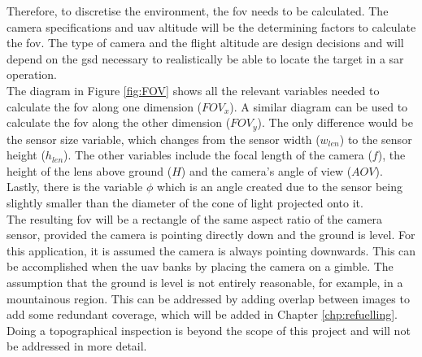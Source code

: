Therefore, to discretise the environment, the \acl{fov} needs to be calculated. The camera specifications and \acs{uav} altitude will be the determining factors to calculate the \acs{fov}. The type of camera and the flight altitude are design decisions and will depend on the \acs{gsd} necessary to realistically be able to locate the target in a \acl{sar} operation.\\
The diagram in Figure \ref{fig:FOV} shows all the relevant variables needed to calculate the \acl{fov} along one dimension ($FOV_x$). A similar diagram can be used to calculate the \acl{fov} along the other dimension ($FOV_y$). The only difference would be the sensor size variable, which changes from the sensor width ($w_{len}$) to the sensor height ($h_{len}$). The other variables include the focal length of the camera ($f$), the height of the lens above ground ($H$) and the camera's angle of view ($AOV$). Lastly, there is the variable $\phi$ which is an angle created due to the sensor being slightly smaller than the diameter of the cone of light projected onto it.\\
The resulting \acl{fov} will be a rectangle of the same aspect ratio of the camera sensor, provided the camera is pointing directly down and the ground is level. For this application, it is assumed the camera is always pointing downwards. This can be accomplished when the \acs{uav} banks by placing the camera on a gimble. The assumption that the ground is level is not entirely reasonable, for example, in a mountainous region. This can be addressed by adding overlap between images to add some redundant coverage, which will be added in Chapter \ref{chp:refuelling}. Doing a topographical inspection is beyond the scope of this project and will not be addressed in more detail.\\
